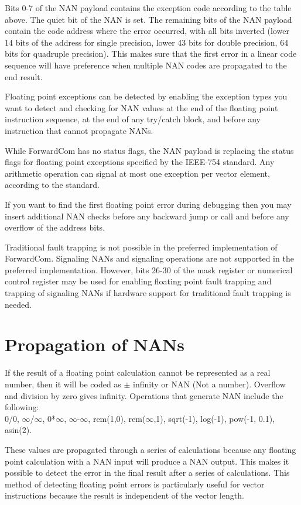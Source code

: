 \documentclass[forwardcom.tex]{subfiles}
\begin{document}
Bits 0-7 of the NAN payload contains the exception code according to the table above. 
The quiet bit of the NAN is set. The remaining bits of the NAN payload contain the code address where the error occurred, with all bits inverted (lower 14 bits of the address for single precision, lower 43 bits for double precision, 64 bits for quadruple precision). This makes sure that the first error in a linear code sequence will have preference when multiple NAN codes are propagated to the end result.
\vv

Floating point exceptions can be detected by enabling the exception types you want to detect and checking for NAN values at the end of the floating point instruction sequence, at the end of any 
try/catch block, and before any instruction that cannot propagate NANs. 
\vv 

While ForwardCom has no status flags, the NAN payload is replacing the 
status flags for floating point exceptions specified by the IEEE-754 standard. 
Any arithmetic operation can signal at most one exception per vector element, according to the standard.
\vv 

If you want to find the first floating point error during debugging then you may insert additional NAN checks before any backward jump or call and before any overflow of the address bits.
\vv

Traditional fault trapping is not possible in the preferred implementation of ForwardCom. Signaling NANs and signaling operations are not supported in the preferred implementation. 
However, bits 26-30 of the mask register or numerical control register may be used for enabling floating point fault trapping and trapping of signaling NANs if hardware support for traditional fault trapping is needed.
\vv


\section{Propagation of NANs}
\label{nanPropagation}
If the result of a floating point calculation cannot be represented as a real number, then it will be coded as $\pm$ infinity or NAN (Not a number). Overflow and division by zero gives infinity.
Operations that generate NAN include the following:\\
0/0, $\infty$/$\infty$, 0*$\infty$, $\infty$-$\infty$, rem(1,0), rem($\infty$,1), sqrt(-1), log(-1), pow(-1, 0.1), asin(2).
\vv

These values are propagated through a series of calculations because any floating point calculation with a NAN input will produce a NAN output. This makes it possible to detect the error in the final result after a series of calculations. This method of detecting floating point errors is particularly useful for vector instructions because the result is independent of the vector length.
\vv
\end{document}

